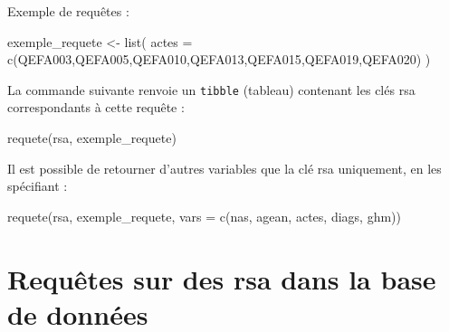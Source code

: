 \documentclass[
]{book}
\newenvironment{Shaded}{\begin{snugshade}}{\end{snugshade}}
\newcommand{\AttributeTok}[1]{\textcolor[rgb]{0.77,0.63,0.00}{#1}}
\newcommand{\FunctionTok}[1]{\textcolor[rgb]{0.00,0.00,0.00}{#1}}
\newcommand{\NormalTok}[1]{#1}
\newcommand{\OtherTok}[1]{\textcolor[rgb]{0.56,0.35,0.01}{#1}}
\newcommand{\StringTok}[1]{\textcolor[rgb]{0.31,0.60,0.02}{#1}}
\begin{document}
Exemple de requêtes :

\begin{Shaded}
\begin{Highlighting}[]
\NormalTok{exemple\_requete }\OtherTok{\textless{}{-}} \FunctionTok{list}\NormalTok{(}
  \AttributeTok{actes =} \FunctionTok{c}\NormalTok{(}\StringTok{\textquotesingle{}QEFA003\textquotesingle{}}\NormalTok{,}\StringTok{\textquotesingle{}QEFA005\textquotesingle{}}\NormalTok{,}\StringTok{\textquotesingle{}QEFA010\textquotesingle{}}\NormalTok{,}\StringTok{\textquotesingle{}QEFA013\textquotesingle{}}\NormalTok{,}\StringTok{\textquotesingle{}QEFA015\textquotesingle{}}\NormalTok{,}\StringTok{\textquotesingle{}QEFA019\textquotesingle{}}\NormalTok{,}\StringTok{\textquotesingle{}QEFA020\textquotesingle{}}\NormalTok{)}
\NormalTok{)}
\end{Highlighting}
\end{Shaded}

La commande suivante renvoie un \texttt{tibble} (tableau) contenant les clés rsa correspondants à cette requête :

\begin{Shaded}
\begin{Highlighting}[]
\FunctionTok{requete}\NormalTok{(rsa, exemple\_requete)}
\end{Highlighting}
\end{Shaded}

Il est possible de retourner d'autres variables que la clé rsa uniquement, en les spécifiant :

\begin{Shaded}
\begin{Highlighting}[]
\FunctionTok{requete}\NormalTok{(rsa, exemple\_requete, }\AttributeTok{vars =} \FunctionTok{c}\NormalTok{(}\StringTok{\textquotesingle{}nas\textquotesingle{}}\NormalTok{, }\StringTok{\textquotesingle{}agean\textquotesingle{}}\NormalTok{, }\StringTok{\textquotesingle{}actes\textquotesingle{}}\NormalTok{, }\StringTok{\textquotesingle{}diags\textquotesingle{}}\NormalTok{, }\StringTok{\textquotesingle{}ghm\textquotesingle{}}\NormalTok{))}
\end{Highlighting}
\end{Shaded}

\hypertarget{requuxeates-sur-des-rsa-dans-la-base-de-donnuxe9es}{%
\section{Requêtes sur des rsa dans la base de données}\label{requuxeates-sur-des-rsa-dans-la-base-de-donnuxe9es}}
\end{document}
